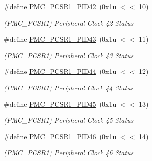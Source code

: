 \begin{DoxyCompactItemize}
\mbox{\label{group__SAMS70__PMC_gaa9dabc6093c0bf2f44a76f602881e210}} 
\#define \mbox{\hyperlink{group__SAMS70__PMC_gaa9dabc6093c0bf2f44a76f602881e210}{P\+M\+C\+\_\+\+P\+C\+S\+R1\+\_\+\+P\+I\+D42}}~(0x1u $<$$<$ 10)
\begin{DoxyCompactList}\small\item\em (P\+M\+C\+\_\+\+P\+C\+S\+R1) Peripheral Clock 42 Status \end{DoxyCompactList}\item 
\mbox{\label{group__SAMS70__PMC_ga373fe9910cd34f16ddfe94f47b70b156}} 
\#define \mbox{\hyperlink{group__SAMS70__PMC_ga373fe9910cd34f16ddfe94f47b70b156}{P\+M\+C\+\_\+\+P\+C\+S\+R1\+\_\+\+P\+I\+D43}}~(0x1u $<$$<$ 11)
\begin{DoxyCompactList}\small\item\em (P\+M\+C\+\_\+\+P\+C\+S\+R1) Peripheral Clock 43 Status \end{DoxyCompactList}\item 
\mbox{\label{group__SAMS70__PMC_ga39088bffa9395fcc9a36b177be66f004}} 
\#define \mbox{\hyperlink{group__SAMS70__PMC_ga39088bffa9395fcc9a36b177be66f004}{P\+M\+C\+\_\+\+P\+C\+S\+R1\+\_\+\+P\+I\+D44}}~(0x1u $<$$<$ 12)
\begin{DoxyCompactList}\small\item\em (P\+M\+C\+\_\+\+P\+C\+S\+R1) Peripheral Clock 44 Status \end{DoxyCompactList}\item 
\mbox{\label{group__SAMS70__PMC_gaa76b2bc1b35ecaa102bf67d62b2b8cc3}} 
\#define \mbox{\hyperlink{group__SAMS70__PMC_gaa76b2bc1b35ecaa102bf67d62b2b8cc3}{P\+M\+C\+\_\+\+P\+C\+S\+R1\+\_\+\+P\+I\+D45}}~(0x1u $<$$<$ 13)
\begin{DoxyCompactList}\small\item\em (P\+M\+C\+\_\+\+P\+C\+S\+R1) Peripheral Clock 45 Status \end{DoxyCompactList}\item 
\mbox{\label{group__SAMS70__PMC_ga0fefdfeff233dd72261c66e41433fb6d}} 
\#define \mbox{\hyperlink{group__SAMS70__PMC_ga0fefdfeff233dd72261c66e41433fb6d}{P\+M\+C\+\_\+\+P\+C\+S\+R1\+\_\+\+P\+I\+D46}}~(0x1u $<$$<$ 14)
\begin{DoxyCompactList}\small\item\em (P\+M\+C\+\_\+\+P\+C\+S\+R1) Peripheral Clock 46 Status \end{DoxyCompactList}\item 
$$
\end{DoxyCompactItemize}
